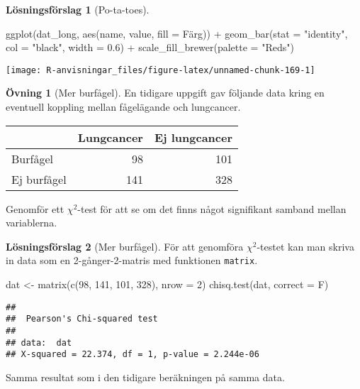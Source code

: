 \documentclass[
]{book}
\newenvironment{Shaded}{\begin{snugshade}}{\end{snugshade}}
\newcommand{\AttributeTok}[1]{\textcolor[rgb]{0.77,0.63,0.00}{#1}}
\newcommand{\DecValTok}[1]{\textcolor[rgb]{0.00,0.00,0.81}{#1}}
\newcommand{\FloatTok}[1]{\textcolor[rgb]{0.00,0.00,0.81}{#1}}
\newcommand{\FunctionTok}[1]{\textcolor[rgb]{0.00,0.00,0.00}{#1}}
\newcommand{\NormalTok}[1]{#1}
\newcommand{\OtherTok}[1]{\textcolor[rgb]{0.56,0.35,0.01}{#1}}
\newcommand{\SpecialCharTok}[1]{\textcolor[rgb]{0.00,0.00,0.00}{#1}}
\newcommand{\StringTok}[1]{\textcolor[rgb]{0.31,0.60,0.02}{#1}}
\theoremstyle{definition}
\theoremstyle{definition}
\theoremstyle{definition}
\newtheorem{exercise}{Övning}[chapter]
\theoremstyle{definition}
\newtheorem{hypothesis}{Lösningsförslag}[chapter]
\theoremstyle{remark}
\begin{document}
\begin{hypothesis}[Po-ta-toes]
\begin{Shaded}
\begin{Highlighting}[]
\FunctionTok{ggplot}\NormalTok{(dat\_long, }\FunctionTok{aes}\NormalTok{(name, value, }\AttributeTok{fill =}\NormalTok{ Färg)) }\SpecialCharTok{+}
  \FunctionTok{geom\_bar}\NormalTok{(}\AttributeTok{stat =} \StringTok{"identity"}\NormalTok{, }\AttributeTok{col =} \StringTok{"black"}\NormalTok{, }\AttributeTok{width =} \FloatTok{0.6}\NormalTok{) }\SpecialCharTok{+}
  \FunctionTok{scale\_fill\_brewer}\NormalTok{(}\AttributeTok{palette =} \StringTok{"Reds"}\NormalTok{)}
\end{Highlighting}
\end{Shaded}

\begin{center}\texttt{[image: R-anvisningar\_files/figure-latex/unnamed-chunk-169-1]} \end{center}

\end{hypothesis}

\begin{exercise}[Mer burfågel]
En tidigare uppgift gav följande data kring en eventuell koppling mellan fågelägande och lungcancer.

\begin{table}
\centering
\begin{tabular}[t]{lrr}
\toprule
  & Lungcancer & Ej lungcancer\\
\midrule
Burfågel & 98 & 101\\
Ej burfågel & 141 & 328\\
\bottomrule
\end{tabular}
\end{table}

Genomför ett \(\chi^2\)-test för att se om det finns något signifikant samband mellan variablerna.
\end{exercise}

\begin{hypothesis}[Mer burfågel]
För att genomföra \(\chi^2\)-testet kan man skriva in data som en 2-gånger-2-matris med funktionen \texttt{matrix}.

\begin{Shaded}
\begin{Highlighting}[]
\NormalTok{dat }\OtherTok{\textless{}{-}} \FunctionTok{matrix}\NormalTok{(}\FunctionTok{c}\NormalTok{(}\DecValTok{98}\NormalTok{, }\DecValTok{141}\NormalTok{, }\DecValTok{101}\NormalTok{, }\DecValTok{328}\NormalTok{), }\AttributeTok{nrow =} \DecValTok{2}\NormalTok{)}
\FunctionTok{chisq.test}\NormalTok{(dat, }\AttributeTok{correct =}\NormalTok{ F)}
\end{Highlighting}
\end{Shaded}

\begin{verbatim}
## 
##  Pearson's Chi-squared test
## 
## data:  dat
## X-squared = 22.374, df = 1, p-value = 2.244e-06
\end{verbatim}

Samma resultat som i den tidigare beräkningen på samma data.
\end{hypothesis}
\end{document}
